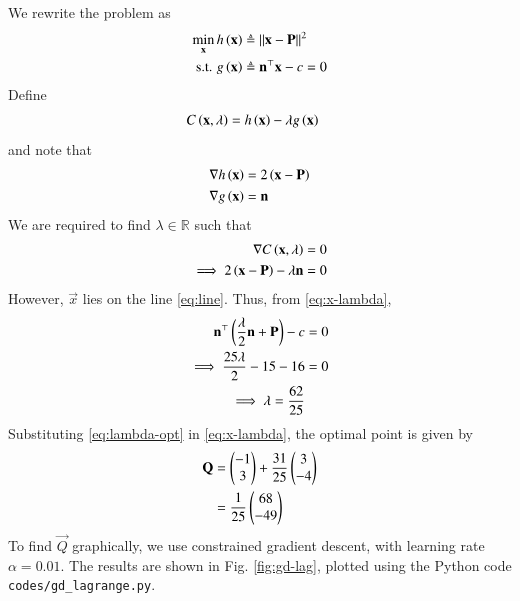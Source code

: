 \documentclass[journal,12pt,twocolumn]{IEEEtran}
\begin{document}
\begin{enumerate}
    \solution We rewrite the problem as
    \begin{align}
        \min_{\mathbf{x}} h\left(\mathbf{x}\right) &\triangleq \left\lVert\mathbf{x}-\mathbf{P}\right\rVert^2 \\
        \textrm{s.t. } g\left(\mathbf{x}\right) &\triangleq \mathbf{n}^\top\mathbf{x} - c = 0
        \label{eq:lag-opt}
    \end{align}
    Define
    \begin{align}
        C\left(\mathbf{x},\lambda\right) &= h\left(\mathbf{x}\right) - \lambda g\left(\mathbf{x}\right)
        \label{eq:C-def}
    \end{align}
    and note that
    \begin{align}
        \nabla h\left(\mathbf{x}\right) &= 2\left(\mathbf{x}-\mathbf{P}\right) \\
        \nabla g\left(\mathbf{x}\right) &= \mathbf{n}
        \label{eq:diff-gh}
    \end{align}
    We are required to find $\lambda \in \mathbb{R}$ such that
    \begin{align}
        \nabla C\left(\mathbf{x},\lambda\right) &= 0 \\
        \implies 2\left(\mathbf{x}-\mathbf{P}\right) - \lambda\mathbf{n} &= 0
        \label{eq:x-lambda}
    \end{align}
    However, $\vec{x}$ lies on the line \eqref{eq:line}. Thus, from
    \eqref{eq:x-lambda},
    \begin{align}
        \mathbf{n}^\top\left(\frac{\lambda}{2}\mathbf{n}+\mathbf{P}\right) - c &= 0 \\
        \implies \frac{25\lambda}{2} - 15 - 16 &= 0 \\
        \implies \lambda = \frac{62}{25}
        \label{eq:lambda-opt}
    \end{align}
    Substituting \eqref{eq:lambda-opt} in \eqref{eq:x-lambda}, the optimal
    point is given by
    \begin{align}
        \mathbf{Q} &= \begin{pmatrix}-1\\3\end{pmatrix} + \frac{31}{25}\begin{pmatrix}3\\-4\end{pmatrix} \\
                &= \frac{1}{25}\begin{pmatrix}68\\-49\end{pmatrix}
                \label{eq:x-sol-lag}
    \end{align}
    To find $\vec{Q}$ graphically, we use constrained gradient descent, with
    learning rate $\alpha = 0.01$. The results are shown in Fig.
    \ref{fig:gd-lag}, plotted using the Python code
    \texttt{codes/gd\_lagrange.py}.
    \begin{figure}[!ht]
        \centering

\end{figure}
\end{enumerate}
\end{document}
